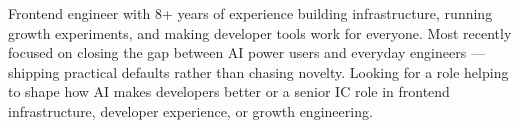 

\begin{cvparagraph}

Frontend engineer with 8+ years of experience building infrastructure, running growth experiments, and making developer tools work for everyone. 
Most recently focused on closing the gap between AI power users and everyday engineers — shipping practical defaults rather than chasing novelty. 
Looking for a role helping to shape how AI makes developers better or a senior IC role in frontend infrastructure, developer experience, or growth engineering.

\end{cvparagraph}
